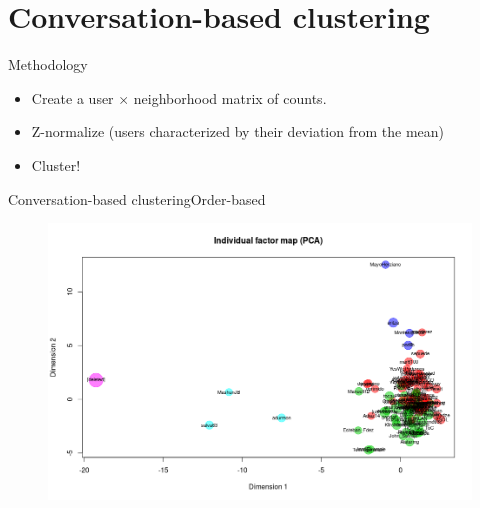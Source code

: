 \documentclass{beamer}
\begin{document}
\section{Conversation-based clustering}
\begin{frame}{Methodology}
	\begin{itemize}
	\item Create a user $\times$ neighborhood matrix of counts.
	\item Z-normalize (users characterized by their deviation from the mean)
	\item Cluster!
\end{itemize}
\end{frame}

\begin{frame}{Conversation-based clustering}{Order-based}
	\begin{figure}
		\centering
		\includegraphics[width=1\textwidth]{PCA_cluster_order_based}
	\end{figure}	
\end{frame}
\end{document}
